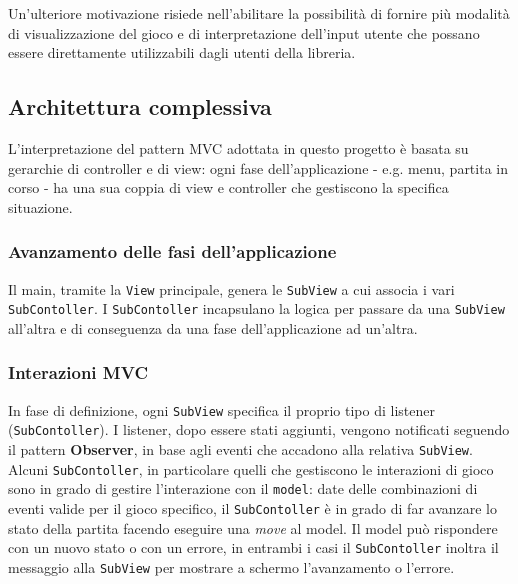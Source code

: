 Un'ulteriore motivazione risiede nell'abilitare la possibilità di fornire più modalità di visualizzazione del gioco e di interpretazione dell'input utente che possano essere direttamente utilizzabili dagli utenti della libreria. 

\subsection{Architettura complessiva}
L'interpretazione del pattern MVC adottata in questo progetto è basata su gerarchie di controller e di view: ogni fase dell'applicazione - e.g. menu, partita in corso - ha una sua coppia di view e controller che gestiscono la specifica situazione.

\subsubsection{Avanzamento delle fasi dell'applicazione}
Il main, tramite la \texttt{View} principale, genera le \texttt{SubView} a cui associa i vari \texttt{SubContoller}.
I \texttt{SubContoller} incapsulano la logica per passare da una \texttt{SubView} all'altra e di conseguenza da una fase dell'applicazione ad un'altra.

\subsubsection{Interazioni MVC}
In fase di definizione, ogni \texttt{SubView} specifica il proprio tipo di listener (\texttt{SubContoller}).
%
I listener, dopo essere stati aggiunti, vengono notificati seguendo il pattern \textbf{Observer}, in base agli eventi che accadono alla relativa \texttt{SubView}.
Alcuni \texttt{SubContoller}, in particolare quelli che gestiscono le interazioni di gioco sono in grado di gestire l'interazione con il \texttt{model}: date delle combinazioni di eventi valide per il gioco specifico, il \texttt{SubContoller} è in grado di far avanzare lo stato della partita facendo eseguire una \textit{move} al model.
%
Il model può rispondere con un nuovo stato o con un errore, in entrambi i casi il \texttt{SubContoller} inoltra il messaggio alla \texttt{SubView} per mostrare a schermo l'avanzamento o l'errore.

